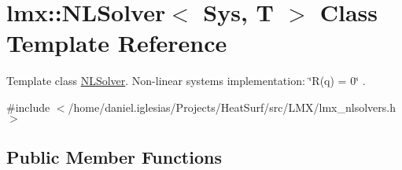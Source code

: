 \hypertarget{classlmx_1_1NLSolver}{\section{lmx\-:\-:N\-L\-Solver$<$ Sys, T $>$ Class Template Reference}
\label{classlmx_1_1NLSolver}
}


Template class \hyperlink{classlmx_1_1NLSolver}{N\-L\-Solver}. Non-\/linear systems implementation\-: \char`\"{}\-R(q) = 0\char`\"{} .  




{\ttfamily \#include $<$/home/daniel.\-iglesias/\-Projects/\-Heat\-Surf/src/\-L\-M\-X/lmx\-\_\-nlsolvers.\-h$>$}

\subsection*{Public Member Functions}
